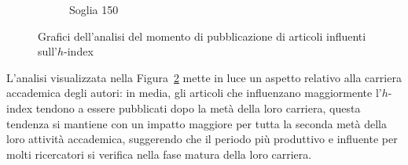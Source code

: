 \begin{figure}[ht]
\begin{subfigure}{0.49\textwidth}
        \caption{Soglia 150}
        \label{fig:Heatmap-of-Weight-Career-150}
    \end{subfigure}        
    \caption{Grafici dell'analisi del momento di pubblicazione di articoli influenti sull'$h$-index}
    \label{fig:Heatmap-of-Weight-Career}
\end{figure}

L'analisi visualizzata nella Figura~\ref{fig:Heatmap-of-Weight-Career} mette in luce un aspetto relativo alla carriera accademica degli autori: in media, gli articoli che influenzano maggiormente l'$h$-index tendono a essere pubblicati dopo la metà della loro carriera, questa tendenza si mantiene con un impatto maggiore per tutta la seconda metà della loro attività accademica, suggerendo che il periodo più produttivo e influente per molti ricercatori si verifica nella fase matura della loro carriera.

